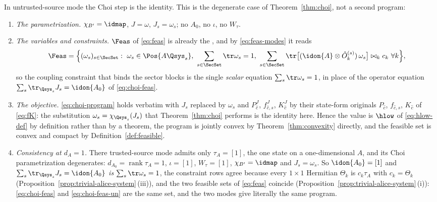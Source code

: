 \begin{definition}
\label{def:untrusted-choi}
In untrusted-source mode the Choi step is the identity. This is the
degenerate case of Theorem~\ref{thm:choi}, not a second program:
\begin{enumerate}[label=(\alph*),leftmargin=2.2em]
\item \emph{The parametrization.} $\chi_{B'}=\idmap$, $J=\omega$,
$J_s=\omega_s$; no $A_0$, no $\iota$, no $W_{\tau}$.
\item \emph{The variables and constraints.} $\Feas$ of
\eqref{eq:feas} is already the , and by
\eqref{eq:feas-modes} it reads
\begin{equation}\label{eq:choi-feas-un}
  \Feas=\Big\{(\omega_s)_{s\in\SecSet}:\
  \omega_s\in\Pos{A\Qsys_s},\
  \sum_{s\in\SecSet}\tr\omega_s=1,\
  \sum_{s\in\SecSet}
  \tr\big[(\idon{A}\otimes\hat O^{(s)}_k)\,\omega_s\big]
  \bowtie_k c_k\ \forall k\Big\},
\end{equation}
so the coupling constraint that binds the sector blocks is the single
\emph{scalar} equation $\sum_s\tr\omega_s=1$, in place of the operator
equation $\sum_s\tr_{\Qsys_s}J_s=\idon{A_0}$ of
\eqref{eq:choi-feas}.
\item \emph{The objective.} \eqref{eq:choi-program} holds verbatim with
$J_s$ replaced by $\omega_s$ and $P^{J}_{\hat c}$, $f^J_{\hat c,s}$,
$K^{J}_{\hat c}$ by their state-form originals
$P_{\hat c}$, $f_{\hat c,s}$, $K_{\hat c}$ of \eqref{eq:fK}: the
substitution $\omega_s=\chi_{\Qsys_s}(J_s)$ that
Theorem~\ref{thm:choi} performs is the identity here. Hence the value
is $\hlow$ of \eqref{eq:hlow-def} by definition rather than by a
theorem, the program is jointly convex by
Theorem~\ref{thm:convexity} directly, and the feasible set is convex
and compact by Definition~\ref{def:feasible}.
\item \emph{Consistency at $d_A=1$.} There trusted-source mode admits only
$\tau_A=[1]$, the one state on a one-dimensional $A$, and its Choi
parametrization degenerates: $d_{A_0}=\operatorname{rank}\tau_A=1$,
$\iota=[1]$, $W_{\tau}=[1]$, $\chi_{B'}=\idmap$ and $J_s=\omega_s$. So
$\idon{A_0}=[1]$ and $\sum_s\tr_{\Qsys_s}J_s=\idon{A_0}$ \emph{is}
$\sum_s\tr\omega_s=1$, the constraint rows agree because every $1\times1$
Hermitian $\Theta_k$ is $c_k\tau_A$ with $c_k=\Theta_k$
(Proposition~\ref{prop:trivial-alice-system}\,(iii)), and the two feasible
sets of \eqref{eq:feas} coincide
(Proposition~\ref{prop:trivial-alice-system}\,(i)): \eqref{eq:choi-feas}
and \eqref{eq:choi-feas-un} are the same set, and the two modes give
literally the same program.
\end{enumerate}
\end{definition}
